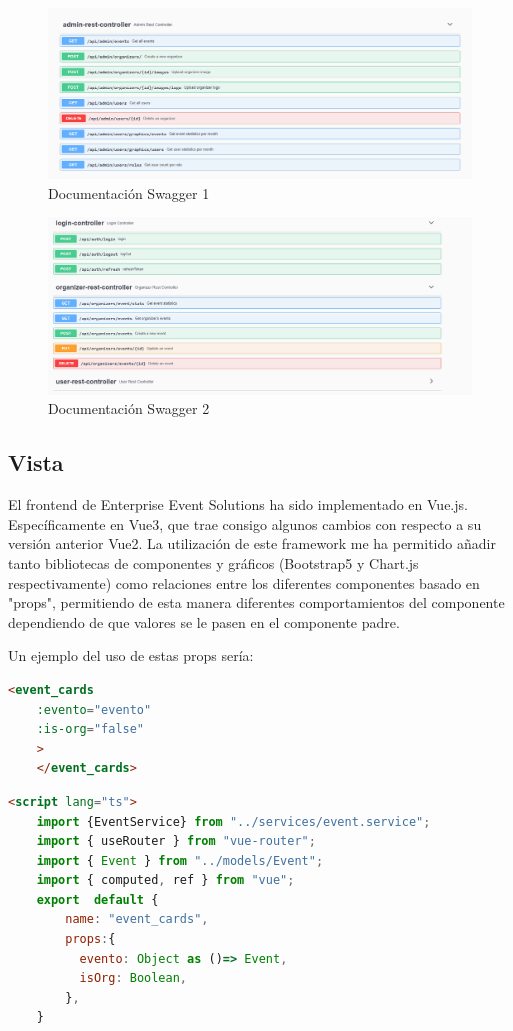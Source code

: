 \begin{figure}[h]
    \centering
    \includegraphics[width=1\textwidth]{Swagger1.png} 
    \caption{Documentación Swagger 1}
    \label{fig:swagger}
\end{figure}
\newpage
\begin{figure}[h]
    \centering
    \includegraphics[width=1\textwidth]{Swagger2.png} 
    \caption{Documentación Swagger 2}
    \label{fig:swagger2}
\end{figure}

\subsection{Vista}
El frontend de Enterprise Event Solutions ha sido implementado en Vue.js. Específicamente en Vue3, que trae consigo algunos cambios con respecto a su versión
anterior Vue2. La utilización de este framework me ha permitido añadir tanto bibliotecas de componentes y gráficos (Bootstrap5 y Chart.js respectivamente)
como relaciones entre los diferentes componentes basado en "props", permitiendo de esta manera diferentes comportamientos del componente dependiendo de
que valores se le pasen en el componente padre.

Un ejemplo del uso de estas props sería:
\myvuestyle
\begin{lstlisting}[language=HTML, caption=Ejemplo del Padre, label=lst:padre]
    <event_cards
    :evento="evento"
    :is-org="false"
    >
    </event_cards>
\end{lstlisting}
\myvuestyle
\begin{lstlisting}[language=HTML, caption=Ejemplo del Hijo, label=lst:hijo]
    <script lang="ts">
    import {EventService} from "../services/event.service";
    import { useRouter } from "vue-router";
    import { Event } from "../models/Event";
    import { computed, ref } from "vue";
    export  default {
        name: "event_cards",
        props:{
          evento: Object as ()=> Event,
          isOrg: Boolean,
        },
    }
\end{lstlisting}

